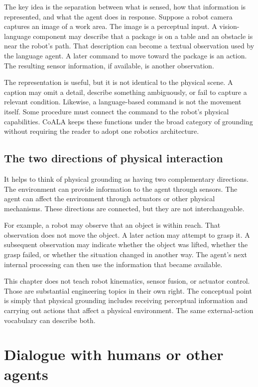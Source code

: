 The key idea is the separation between what is sensed, how that information is represented, and what the agent does in response. Suppose a robot camera captures an image of a work area. The image is a perceptual input. A vision-language component may describe that a package is on a table and an obstacle is near the robot's path. That description can become a textual observation used by the language agent. A later command to move toward the package is an action. The resulting sensor information, if available, is another observation.

The representation is useful, but it is not identical to the physical scene. A caption may omit a detail, describe something ambiguously, or fail to capture a relevant condition. Likewise, a language-based command is not the movement itself. Some procedure must connect the command to the robot's physical capabilities. CoALA keeps these functions under the broad category of grounding without requiring the reader to adopt one robotics architecture.

\subsection{The two directions of physical interaction}

It helps to think of physical grounding as having two complementary directions. The environment can provide information to the agent through sensors. The agent can affect the environment through actuators or other physical mechanisms. These directions are connected, but they are not interchangeable.

For example, a robot may observe that an object is within reach. That observation does not move the object. A later action may attempt to grasp it. A subsequent observation may indicate whether the object was lifted, whether the grasp failed, or whether the situation changed in another way. The agent's next internal processing can then use the information that became available.

This chapter does not teach robot kinematics, sensor fusion, or actuator control. Those are substantial engineering topics in their own right. The conceptual point is simply that physical grounding includes receiving perceptual information and carrying out actions that affect a physical environment. The same external-action vocabulary can describe both.

\section{Dialogue with humans or other agents}
\label{sec:dialogue-environments}


